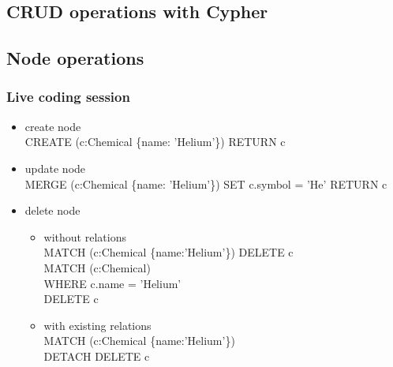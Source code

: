 \documentclass[12pt]{beamer}
\begin{document}
    \subsection{CRUD operations with Cypher}
    \subsection{Node operations}
    \begin{frame}
        \frametitle{Live coding session}
        \begin{itemize}
            \item create node\\
            CREATE (c:Chemical \{name: 'Helium'\}) RETURN c
            \item update node\\
            MERGE (c:Chemical \{name: 'Helium'\}) SET c.symbol = 'He' RETURN c
            \item delete node 
            \begin{itemize}
                \item without relations\\
                MATCH (c:Chemical \{name:'Helium'\}) DELETE c\\
                MATCH (c:Chemical)\\
                \hspace{1cm} WHERE c.name = 'Helium'\\
                \hspace{1cm} DELETE c
                \item with existing relations\\
                MATCH (c:Chemical \{name:'Helium'\})\\
                \hspace{1cm} DETACH DELETE c\\
            \end{itemize}
        \end{itemize}
    \end{frame}
    
\end{document}
